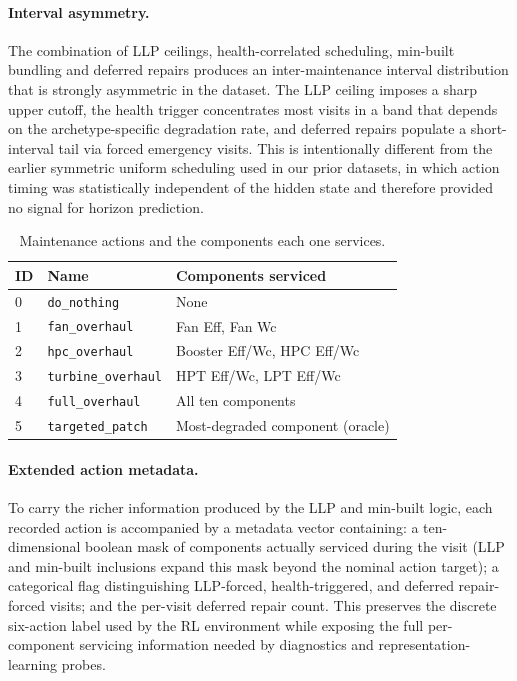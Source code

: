 \paragraph{Interval asymmetry.}
The combination of LLP ceilings, health-correlated scheduling,
min-built bundling and deferred repairs produces an inter-maintenance interval
distribution that is strongly asymmetric in the dataset. The LLP
ceiling imposes a sharp upper cutoff, the health trigger concentrates
most visits in a band that depends on the archetype-specific
degradation rate, and deferred repairs populate a short-interval tail via
forced emergency visits. This is intentionally different from the
earlier symmetric uniform scheduling used in our prior datasets, in
which action timing was statistically independent of the hidden state
and therefore provided no signal for horizon prediction.

\begin{table}[h]
\centering
\caption{Maintenance actions and the components each one services.}
\label{tab:actions}
\small
\begin{tabular}{llp{6.0cm}}
\toprule
ID & Name & Components serviced \\
\midrule
0 & \texttt{do\_nothing}       & None \\
1 & \texttt{fan\_overhaul}     & Fan Eff, Fan Wc \\
2 & \texttt{hpc\_overhaul}     & Booster Eff/Wc, HPC Eff/Wc \\
3 & \texttt{turbine\_overhaul} & HPT Eff/Wc, LPT Eff/Wc \\
4 & \texttt{full\_overhaul}    & All ten components \\
5 & \texttt{targeted\_patch}   & Most-degraded component (oracle) \\
\bottomrule
\end{tabular}
\end{table}

\paragraph{Extended action metadata.}
To carry the richer information produced by the LLP and min-built
logic, each recorded action is accompanied by a metadata vector
containing: a ten-dimensional boolean mask of components actually
serviced during the visit (LLP and min-built inclusions expand this
mask beyond the nominal action target); a categorical flag
distinguishing LLP-forced, health-triggered, and deferred repair-forced
visits; and the per-visit deferred repair count. This preserves the discrete
six-action label used by the RL environment while exposing the full
per-component servicing information needed by diagnostics and
representation-learning probes.

